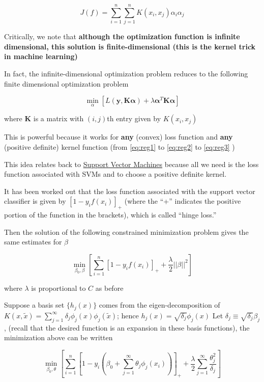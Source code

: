 \documentclass[
]{book}
\begin{document}
\[
J(f) = \sum_{i=1}^n \sum_{j=1}^n K(x_i, x_j) \alpha_i \alpha_j
\]

Critically, we note that \textbf{although the optimization function is infinite dimensional, this solution is finite-dimensional (this is the kernel trick in machine learning)}

In fact, the infinite-dimensional optimization problem reduces to the following finite dimensional optimization problem

\begin{equation}
\label{eq:reg3}
\underset{\alpha}{\operatorname{min}} [ L(\mathbf{y}, \mathbf{K\alpha})+ \lambda \mathbf{\alpha}^T \mathbf{K \alpha}]
\end{equation}

where \(\mathbf{K}\) is a matrix with \((i,j)\)th entry given by \(K(x_i, x_j)\)

This is powerful because it works for \textbf{any} (convex) loss function and \textbf{any} (positive definite) kernel function (from \eqref{eq:reg1} to \eqref{eq:reg2} to \eqref{eq:reg3} )

This idea relates back to \protect\hyperlink{support-vector-machines}{Support Vector Machines} because all we need is the loss function associated with SVMs and to choose a positive definite kernel.

It has been worked out that the loss function associated with the support vector classifier is given by \([1 - y_i f(x_i)]_+\) (where the ``+'' indicates the positive portion of the function in the brackets), which is called ``hinge loss.''

Then the solution of the following constrained minimization problem gives the same estimates for \(\beta\)

\begin{equation}
\label{eq:reg4}
\underset{\beta_0, \beta}{\operatorname{min}} [ \sum_{i=1}^n [1 - y_i f(x_i)]_+ + \frac{\lambda}{2}||\beta||^2]
\end{equation}

where \(\lambda\) is proportional to \(C\) as before

Suppose a basis set \(\{ h_j(x) \}\) comes from the eigen-decomposition of \(K(x, \tilde{x}) = \sum_{j = 1}^\infty \delta_j \phi_j (x) \phi_j (\tilde{x})\); hence \(h_j(x) = \sqrt{\delta_j} \phi_j(x)\) Let \(\delta_j \equiv \sqrt{\delta_j} \beta_j\), (recall that the desired function is an expansion in these basis functions), the minimization above can be written

\begin{equation}
\label{eq:reg5}
\underset{\beta_0, \theta}{\operatorname{min}} [ \sum_{i=1}^n [1 - y_i (\beta_0 + \sum_{j=1}^\infty \theta_j \phi_j(x_i))]_+ + \frac{\lambda}{2} \sum_{j=1}^\infty \frac{\theta_j^2}{\delta_j}]
\end{equation}
\end{document}
